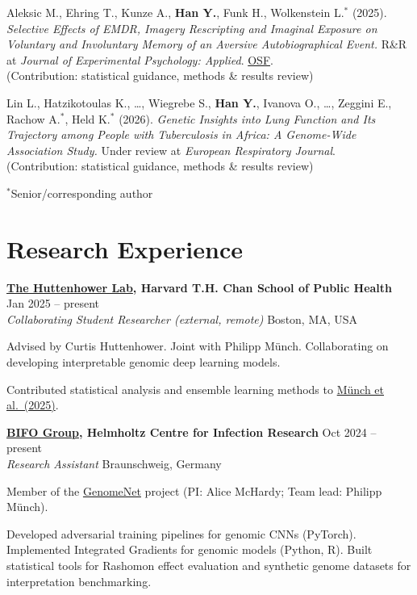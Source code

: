 \documentclass[a4paper,11pt]{article}
\newcommand{\entry}[4]{%
  \textbf{#1} \hfill #2\\
  \textit{#3} \hfill #4\par
}
\newenvironment{details}{%
  \begin{list}{}{%
    \setlength{\leftmargin}{1.5em}%
    \setlength{\rightmargin}{0pt}%
    \setlength{\topsep}{0.1em}%
    \setlength{\parsep}{0.2em}%
    \setlength{\itemsep}{0pt}%
  }%
  \item[]%
}{%
  \end{list}%
}
\begin{document}
\vspace{0.4em}

Aleksic M., Ehring T., Kunze A., \textbf{Han Y.}, Funk H., Wolkenstein L.$^*$ (2025).
\emph{Selective Effects of EMDR, Imagery Rescripting and Imaginal Exposure on Voluntary and Involuntary Memory of an Aversive Autobiographical Event.}
R\&R at \textit{Journal of Experimental Psychology: Applied}. \href{https://doi.org/10.31219/osf.io/9hmdb_v2}{OSF}.\\
{\small (Contribution: statistical guidance, methods \& results review)}

\vspace{0.4em}

Lin L., Hatzikotoulas K., \ldots, Wiegrebe S., \textbf{Han Y.}, Ivanova O., \ldots, Zeggini E., Rachow A.$^*$, Held K.$^*$ (2026).
\emph{Genetic Insights into Lung Function and Its Trajectory among People with Tuberculosis in Africa: A Genome-Wide Association Study.} Under review at \textit{European Respiratory Journal}.\\
{\small (Contribution: statistical guidance, methods \& results review)}

\vspace{0.2em}
{\footnotesize $^*$Senior/corresponding author}

\section*{Research Experience}

\entry{\href{https://huttenhower.sph.harvard.edu/people/}{The Huttenhower Lab}, Harvard T.H. Chan School of Public Health}{Jan 2025 -- present}
      {Collaborating Student Researcher (external, remote)}{Boston, MA, USA}
\begin{details}
Advised by Curtis Huttenhower. Joint with Philipp Münch. Collaborating on developing interpretable genomic deep learning models.

Contributed statistical analysis and ensemble learning methods to \href{https://doi.org/10.1101/2025.11.24.690272}{Münch et al.\ (2025)}.
\end{details}

\entry{\href{https://www.helmholtz-hzi.de/en/research/research-groups/details/computational-biology-for-infection-research/}{BIFO Group}, Helmholtz Centre for Infection Research}{Oct 2024 -- present}
      {Research Assistant}{Braunschweig, Germany}
\begin{details}
Member of the \href{https://github.com/GenomeNet}{GenomeNet} project (PI: Alice McHardy; Team lead: Philipp Münch).

Developed adversarial training pipelines for genomic CNNs (PyTorch).
Implemented Integrated Gradients for genomic models (Python, R).
Built statistical tools for Rashomon effect evaluation and synthetic genome datasets for interpretation benchmarking.
\end{details}
\end{document}
